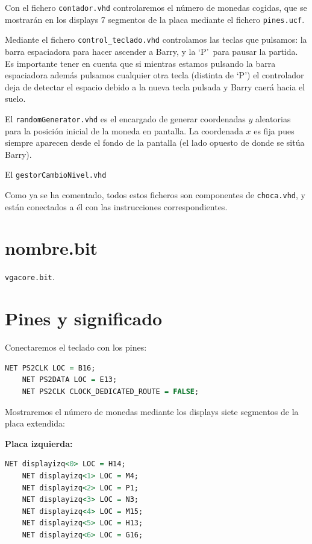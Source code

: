\documentclass[11pt, a4paper, spanish, openright, twoside]{book}
\begin{document}
Con el fichero \texttt{contador.vhd} controlaremos el número de monedas cogidas, que se mostrarán en los displays 7 segmentos de la placa mediante el fichero \texttt{pines.ucf}.

Mediante el fichero \texttt{control\_teclado.vhd} controlamos las teclas que pulsamos: la barra espaciadora para hacer ascender a Barry, y la `P'\ para pausar la partida. Es importante tener en cuenta que si mientras estamos pulsando la barra espaciadora además pulsamos cualquier otra tecla (distinta de `P') el controlador deja de detectar el espacio debido a la nueva tecla pulsada y Barry caerá hacia el suelo.

El \texttt{randomGenerator.vhd} es el encargado de generar coordenadas $y$ aleatorias para la posición inicial de la moneda en pantalla. La coordenada $x$ es fija pues siempre aparecen desde el fondo de la pantalla (el lado opuesto de donde se sitúa Barry).

El \texttt{gestorCambioNivel.vhd}  %

Como ya se ha comentado, todos estos ficheros son componentes de \texttt{choca.vhd}, y están conectados a él con las instrucciones correspondientes.

\section{nombre.bit}

\texttt{vgacore.bit}.

\section{Pines y significado}
Conectaremos el teclado con los pines:

\begin{lstlisting}[language=VHDL]
	NET PS2CLK LOC = B16;
	NET PS2DATA LOC = E13;
	NET PS2CLK CLOCK_DEDICATED_ROUTE = FALSE;
\end{lstlisting}


Mostraremos el número de monedas mediante los displays siete segmentos de la placa extendida:

\textbf{Placa izquierda:}

\begin{lstlisting}[language=VHDL]
	NET displayizq<0> LOC = H14;
	NET displayizq<1> LOC = M4;
	NET displayizq<2> LOC = P1;
	NET displayizq<3> LOC = N3;
	NET displayizq<4> LOC = M15;
	NET displayizq<5> LOC = H13;
	NET displayizq<6> LOC = G16;
\end{lstlisting}
\end{document}
